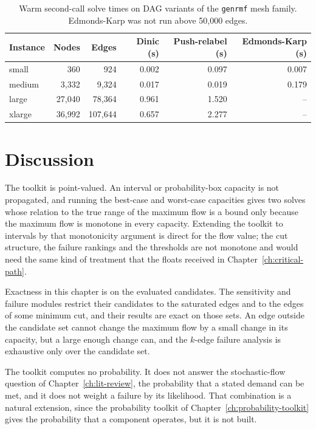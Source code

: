 \documentclass[12pt]{report}
\begin{document}
\begin{table}[htbp]
\centering
\caption{Warm second-call solve times on DAG variants of the \texttt{genrmf} mesh family.
Edmonds-Karp was not run above 50,000 edges.}
\label{tab:flow-dimacs}
\small
\renewcommand{\arraystretch}{1.15}
\begin{tabular}{lrrrrr}
\toprule
Instance & Nodes & Edges & Dinic (s) & Push-relabel (s) & Edmonds-Karp (s) \\
\midrule
small  & 360    & 924     & 0.002 & 0.097 & 0.007 \\
medium & 3,332  & 9,324   & 0.017 & 0.019 & 0.179 \\
large  & 27,040 & 78,364  & 0.961 & 1.520 & -- \\
xlarge & 36,992 & 107,644 & 0.657 & 2.277 & -- \\
\bottomrule
\end{tabular}
\end{table}

\section{Discussion}
\label{sec:flow-discussion}

The toolkit is point-valued. An interval or probability-box capacity is not propagated, and
running the best-case and worst-case capacities gives two solves whose relation to the true
range of the maximum flow is a bound only because the maximum flow is monotone in every
capacity. Extending the toolkit to intervals by that monotonicity argument is direct for the
flow value; the cut structure, the failure rankings and the thresholds are not monotone and
would need the same kind of treatment that the floats received in
Chapter~\ref{ch:critical-path}.

Exactness in this chapter is on the evaluated candidates. The sensitivity and failure modules
restrict their candidates to the saturated edges and to the edges of some minimum cut, and
their results are exact on those sets. An edge outside the candidate set cannot change the
maximum flow by a small change in its capacity, but a large enough change can, and the
$k$-edge failure analysis is exhaustive only over the candidate set.

The toolkit computes no probability. It does not answer the stochastic-flow question of
Chapter~\ref{ch:lit-review}, the probability that a stated demand can be met, and it does not
weight a failure by its likelihood. That combination is a natural extension, since the
probability toolkit of Chapter~\ref{ch:probability-toolkit} gives the probability that a
component operates, but it is not built.
\end{document}
